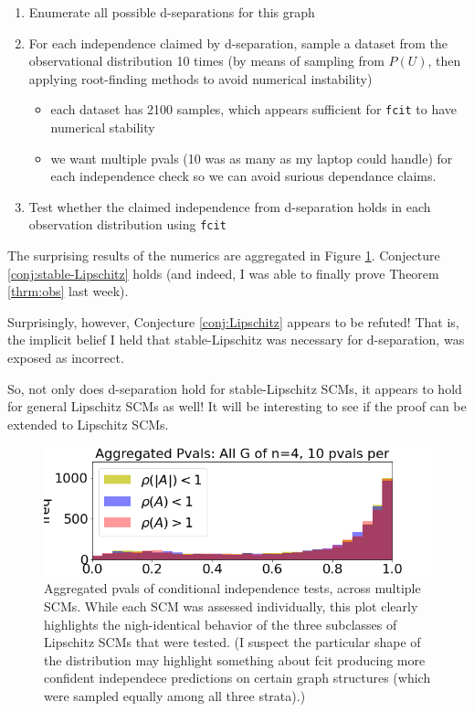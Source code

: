 \documentclass[12pt]{article}
\begin{document}
\begin{enumerate}
  \item Enumerate all possible d-separations for this graph
  \item For each independence claimed by d-separation, sample a dataset from the observational distribution 10 times (by means of sampling from $P(U)$, then applying root-finding methods to avoid numerical instability)
  \begin{itemize}
  	\item each dataset has 2100 samples, which appears sufficient for \verb|fcit| to have numerical stability
  	\item we want multiple pvals (10 was as many as my laptop could handle) for each independence check so we can avoid surious dependance claims.
  \end{itemize}
  \item Test whether the claimed independence from d-separation holds in each observation distribution using \verb|fcit|
\end{enumerate}

The surprising results of the numerics are aggregated in Figure \ref{fig:aggregated-plot}. Conjecture \ref{conj:stable-Lipschitz} holds (and indeed, I was able to finally prove Theorem \ref{thrm:obs} last week).

Surprisingly, however, Conjecture \ref{conj:Lipschitz} appears to be refuted! That is, the implicit belief I held that stable-Lipschitz was necessary for d-separation, was exposed as incorrect. 

So, not only does d-separation hold for stable-Lipschitz SCMs, it appears to hold for general Lipschitz SCMs as well! It will be interesting to see if the proof can be extended to Lipschitz SCMs.

\begin{figure}
\centering
\includegraphics[width=.7\linewidth]{pics/my_own/aggregated_plot.png}
\caption{Aggregated pvals of conditional independence tests, across multiple SCMs. While each SCM was assessed individually, this plot clearly highlights the nigh-identical behavior of the three subclasses of Lipschitz SCMs that were tested. (I suspect the particular shape of the distribution may highlight something about fcit producing more confident independece predictions on certain graph structures (which were sampled equally among all three strata).)}
\label{fig:aggregated-plot}
\end{figure}
\end{document}
